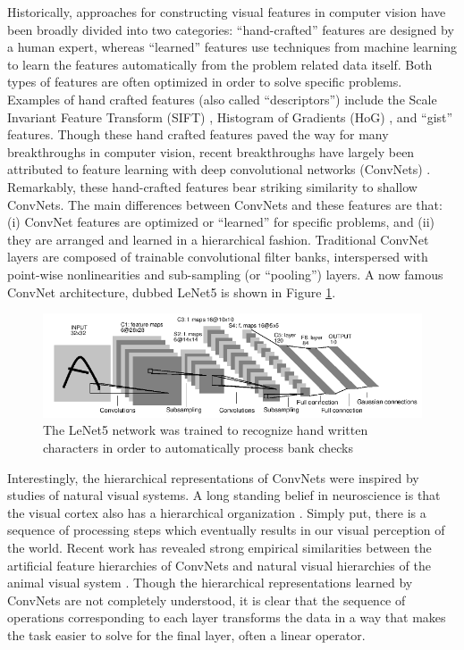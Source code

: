 Historically, approaches for constructing visual features in computer vision
have been broadly divided into two categories: ``hand-crafted'' features are
designed by a human expert, whereas ``learned'' features use techniques from
machine learning to learn the features automatically from the problem related
data itself. Both types of features are often optimized in order to solve
specific problems. Examples of hand crafted features (also called
``descriptors'') include the Scale Invariant Feature Transform (SIFT)
\cite{SIFT}, Histogram of Gradients (HoG) \cite{HoG}, and ``gist'' \cite{gist}
features. Though these hand crafted features paved the way for many
breakthroughs in computer vision, recent breakthroughs have largely been
attributed to feature learning with deep convolutional networks (ConvNets)
\cite{fukushima1980, LeCun1998, ImageNet}.  Remarkably, these hand-crafted
features bear striking similarity to shallow ConvNets. The main differences
between ConvNets and these features are that: (i) ConvNet features are
optimized or ``learned'' for specific problems, and (ii) they are arranged and
learned in a hierarchical fashion. Traditional ConvNet layers are composed of
trainable convolutional filter banks, interspersed with point-wise
nonlinearities and sub-sampling (or ``pooling'') layers.  A now famous ConvNet
architecture, dubbed LeNet5 \cite{LeCun1998} is shown in Figure \ref{fig:LeNet5}.       

\begin{figure} 
\centering
\includegraphics[scale=0.5]{./figures/introduction/lenet5.png} 
\caption{The LeNet5 network was trained to recognize hand written characters in order to 
automatically process bank checks} 
\label{fig:LeNet5} 
\end{figure}  

Interestingly, the hierarchical representations of ConvNets were inspired by
studies of natural visual systems. A long standing belief in neuroscience is
that the visual cortex also has a hierarchical organization
\cite{hubel1968,felleman1991}. Simply put, there is a sequence of processing
steps which eventually results in our visual perception of the world. Recent
work has revealed strong empirical similarities between the artificial feature
hierarchies of ConvNets and natural visual hierarchies of the animal visual
system \cite{yamins2014}. Though the hierarchical representations learned by
ConvNets are not completely understood, it is clear that the sequence of
operations corresponding to each layer transforms the data in a way that makes
the task easier to solve for the final layer, often a linear operator.    

